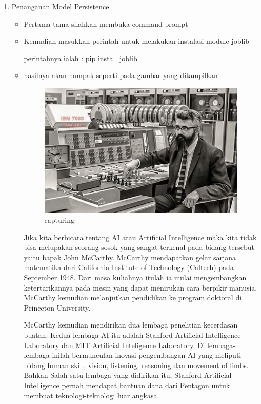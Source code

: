 \begin{enumerate}
\begin{itemize}
\par
\par
\par
\end{itemize}
\item Penanganan Model Persistence
\begin{itemize}
\item Pertama-tama silahkan membuka command prompt
\item Kemudian masukkan perintah untuk melakukan instalasi module joblib
\par perintahnya ialah : pip install joblib
\item hasilnya akan nampak seperti pada gambar yang ditampilkan
\par
\begin{figure}[ht]
\centering
\includegraphics[scale=0.5]{figures/contoh.JPG}
\caption{capturing}
\label{contoh}
\end{figure}

\par Jika kita berbicara tentang AI atau Artificial Intelligence maka kita tidak bisa melupakan seorang sosok yang sangat terkenal pada bidang tersebut yaitu bapak John McCarthy.
McCarthy mendapatkan gelar sarjana matematika dari California Institute of Technology (Caltech) pada September 1948. Dari masa kuliahnya itulah ia mulai mengembangkan ketertarikannya pada mesin yang dapat menirukan cara berpikir manusia. McCarthy kemudian melanjutkan pendidikan ke program doktoral di Princeton University.

\par McCarthy kemudian mendirikan dua lembaga penelitian kecerdasan buatan. Kedua lembaga AI itu adalah Stanford Artificial Intelligence Laboratory dan MIT Artificial Inteligence Laboratory. Di lembaga-lembaga inilah bermunculan inovasi pengembangan AI yang meliputi bidang human skill, vision, listening, reasoning dan movement of limbs. Bahkan Salah satu lembaga yang didirikan itu, Stanford Artificial Intelligence pernah mendapat bantuan dana dari Pentagon untuk membuat teknologi-teknologi luar angkasa.


\end{itemize}
\end{enumerate}
